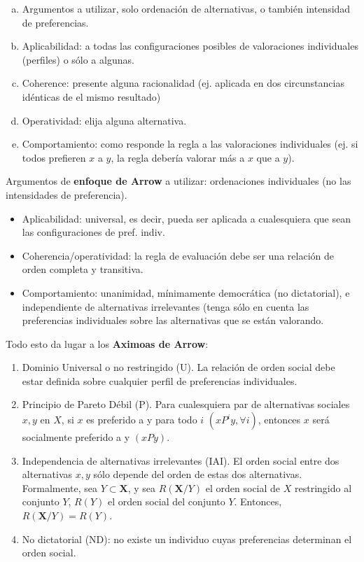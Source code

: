 \begin{enumerate}[a)]
    \item Argumentos a utilizar, solo ordenación de alternativas, o también intensidad de preferencias.
    \item Aplicabilidad: a todas las configuraciones posibles de valoraciones individuales (perfiles) o sólo a algunas.
    \item Coherence: presente alguna racionalidad (ej. aplicada en dos circunstancias idénticas de el mismo resultado)
    \item Operatividad: elija alguna alternativa.
    \item Comportamiento: como responde la regla a las valoraciones individuales (ej. si todos prefieren $x$ a $y$, la regla debería valorar más a $x$ que a $y$).
\end{enumerate}

Argumentos de \textbf{enfoque de Arrow} a utilizar: ordenaciones individuales (no las intensidades de preferencia).
\begin{itemize}
    \item  Aplicabilidad: universal, es decir, pueda ser aplicada a cualesquiera que sean las configuraciones de pref. indiv.
    \item  Coherencia/operatividad: la regla de evaluación debe ser una relación de orden completa y transitiva.
    \item  Comportamiento: unanimidad, mínimamente democrática (no dictatorial), e independiente de alternativas irrelevantes (tenga sólo en cuenta las preferencias individuales sobre las alternativas que se están valorando.
\end{itemize}

Todo esto da lugar a los \textbf{Aximoas de Arrow}:

\begin{enumerate}[\bfseries 1.]
    \item Dominio Universal o no restringido (U). La relación de orden social debe estar definida sobre cualquier perfil de preferencias individuales.
    \item Principio de Pareto Débil (P). Para cualesquiera par de alternativas sociales $x,y$ en $X$, si $x$ es preferido a y para todo $i$ $(xP^iy,\forall i)$, entonces $x$ será socialmente preferido a y $(xPy)$.
    \item Independencia de alternativas irrelevantes (IAI). El orden social entre dos alternativas $x,y$ sólo depende del orden de estas dos alternativas. Formalmente, sea $Y\subset \textbf{X}$, y sea $R(\textbf{X}/Y)$ el orden social de $X$ restringido al conjunto $Y$, $R(Y)$ el orden social del conjunto $Y$. Entonces, $R(\textbf{X}/Y) = R(Y)$.
    \item No dictatorial (ND): no existe un individuo cuyas preferencias determinan el orden social.
\end{enumerate}

